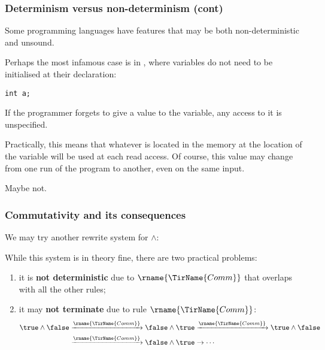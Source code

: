 %
\begin{frame}[containsverbatim]
\frametitle{Determinism versus non-determinism (cont)}

\noindent Some programming languages have features that may be both
non-deterministic and unsound.

\bigskip

Perhaps the most infamous case is in \C, where variables do not need
to be initialised at their declaration: {\small
\begin{verbatim}
int a;
\end{verbatim}
}
If the programmer forgets to give a value to the variable, any access
to it is unspecified. 

\bigskip

Practically, this means that whatever is located in the memory at the
location of the variable will be used at each read access. Of course,
this value may change from one run of the program to another, even
on the same input. 

\bigskip

Maybe not.

\end{frame}

%
\begin{frame}
\frametitle{Commutativity and its consequences}

We may try another rewrite system for \(\wedge\):
While this system is in theory fine, there are two practical problems:
\begin{enumerate}

  \item it is \textbf{not deterministic} due to 
    \(\rname{\TirName{Comm}}\) that overlaps with all the other rules;

  \item it may \textbf{not terminate} due to rule
    \(\rname{\TirName{Comm}}\):
\begin{align*}
\true \wedge \false &\xrightarrow{\rname{\TirName{Comm}}} \false \wedge
\true \xrightarrow{\rname{\TirName{Comm}}} \true \wedge \false\\
&\xrightarrow{\rname{\TirName{Comm}}} \false \wedge \true \rightarrow
\cdots
\end{align*}

\end{enumerate}

\end{frame}

